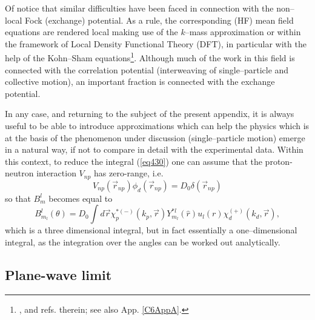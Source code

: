 \begin{subappendices}
 
 Of notice that similar difficulties have been faced in connection with the non--local Fock (exchange) potential. As a rule, the corresponding (HF) mean field equations are rendered local making use of the $k$--mass approximation or within the framework of Local Density Functional Theory (DFT), in particular with the help of the Kohn--Sham equations\footnote{\cite{Mahaux:85}, \cite{Broglia:04b} and refs. therein; see also App. \ref{C6AppA}.}. Although much of the work in this field is connected with the correlation potential  (interweaving of single--particle and collective motion), an important fraction is connected with the exchange potential.
 
 
 In any case, and returning to the subject of the present appendix, it is always useful to be able to introduce approximations which can help the physics which is at the basis of the phenomenon under discussion (single--particle motion) emerge in a natural way, if not to compare in detail with the experimental data. 
Within this context, to reduce the integral (\ref{eq430}) one can assume that the proton-neutron interaction $V_{np}$ has zero-range, i.e.
\begin{equation}\label{eqC6AppE15}
 V_{np}(\vec r_{np})\phi_d(\vec r_{np})=D_0 \delta(\vec r_{np})
\end{equation}
so that  $B_{m}^l$ becomes equal to
\begin{equation}\label{eqC6E16}
B_{m_l}^l(\theta)=D_0 \int d\vec r \chi^{* (-)}_p(k_p,\vec r) Y_{m_l}^{*l}(\hat r) u_{l}(r)
\chi^{(+)}_d(k_d,\vec r),
\end{equation}
which is  a three dimensional integral, but in fact essentially a one--dimensional integral, as the integration over the angles can be worked out analytically.


\subsection{Plane-wave limit}



\end{subappendices}
